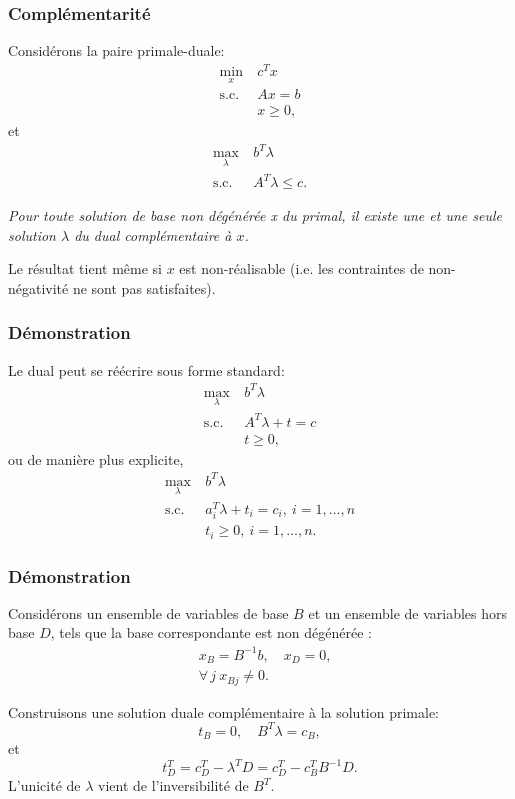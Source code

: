 \documentclass[usepdftitle=false]{beamer}
\begin{document}
\begin{frame}
\frametitle{Complémentarité}

Considérons la paire primale-duale:
\begin{align*}
\min_x\ & c^T x \\
\mbox{s.c. } & Ax = b \\
& x \geq 0,
\end{align*}
et
\begin{align*}
\max_{\lambda} \ & b^T \lambda \\
\mbox{s.c. } & A^T \lambda \leq c.
\end{align*}

\textit{Pour toute solution de base non dégénérée x du primal, il existe une et une seule solution $\lambda$ du dual complémentaire à $x$.}

Le résultat tient même si $x$ est non-réalisable (i.e. les contraintes de non-négativité ne sont pas satisfaites).

\end{frame}

\begin{frame}
\frametitle{Démonstration}

Le dual peut se réécrire sous forme standard:
\begin{align*}
\max_{\lambda} \ & b^T\lambda \\
\mbox{s.c. } & A^T \lambda + t = c \\
& t \geq 0,
\end{align*}
ou de manière plus explicite,
\begin{align*}
\max_{\lambda} \ & b^T\lambda \\
\mbox{s.c. } & a_i^T \lambda + t_i = c_i,\ i = 1,\ldots,n \\
& t_i \geq 0,\ i = 1,\ldots,n.
\end{align*}

\end{frame}

\begin{frame}
\frametitle{Démonstration}

Considérons un ensemble de variables de base $B$ et un ensemble de variables hors base $D$, tels que la base correspondante est non dégénérée :
\begin{align*}
& x_B = B^{-1}b, \quad x_D = 0, \\
& \forall\, j\ x_{Bj} \ne 0.
\end{align*}

Construisons une solution duale complémentaire à la solution primale:
\[
t_B = 0, \quad B^T\lambda = c_B,
\]
et
$$
t_D^T = c_D^T - \lambda^TD = c_D^T - c_B^TB^{-1}D.
$$
L'unicité de $\lambda$ vient de l'inversibilité de $B^T$.

\end{frame}
\end{document}
